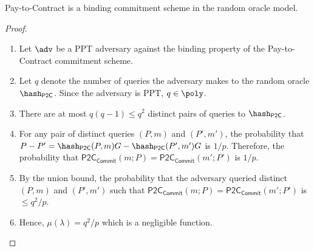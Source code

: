 \begin{lemma}
    Pay-to-Contract is a binding commitment scheme in the random oracle model.
\end{lemma}
\begin{proof}
     $ $\par
  \begin{enumerate}
    \item Let $\adv$ be a PPT adversary against the binding property of the Pay-to-Contract commitment scheme.
    \item Let $q$ denote the number of queries the adversary makes to the random oracle $\HPTOC$. Since the adversary is PPT, $q \in \poly$.
    \item There are at most $q(q-1) \le q^2$ distinct pairs of queries to $\HPTOC$.
    \item For any pair of distinct queries $(P, m)$ and $(P', m')$, the probability that $P - P' = \HPTOC(P, m)G - \HPTOC(P', m')G$ is $1/p$.
          Therefore, the probability that $\mathsf{P2C}_\mathsf{Commit}(m; P) = \mathsf{P2C}_\mathsf{Commit}(m'; P')$ is $1/p$.
    \item By the union bound, the probability that the adversary queried distinct $(P, m)$ and $(P', m')$ such that $\mathsf{P2C}_\mathsf{Commit}(m; P) = \mathsf{P2C}_\mathsf{Commit}(m'; P')$ is $\le q^2/p$.
    \item Hence, $\mu(\lambda) = q^2/p$ which is a negligible function.
  \end{enumerate}
\end{proof}


